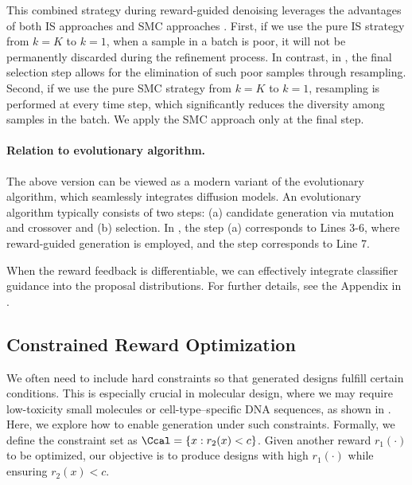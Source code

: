 This combined strategy during reward-guided denoising leverages the advantages of both IS approaches \citep{li2024derivative} and SMC approaches \citep{wu2024practical}. First, if we use the pure IS strategy from  $k=K$ to $k=1$, when a sample in a batch is poor, it will not be permanently discarded during the refinement process. In contrast, in , the final selection step allows for the elimination of such poor samples through resampling. Second, if we use the pure SMC strategy from $k=K$ to $k=1$, resampling is performed at every time step, which significantly reduces the diversity among samples in the batch. We apply the SMC approach only at the final step.


\vspace{-2mm}
\paragraph{Relation to evolutionary algorithm.} The above version can be viewed as a modern variant of the evolutionary algorithm, which seamlessly integrates diffusion models. An evolutionary algorithm typically consists of two steps: (a) candidate generation via mutation and crossover and (b) selection. In , the step (a) corresponds to Lines 3-6, where reward-guided generation is employed, and the step corresponds to Line 7. 


\begin{remark}
When the reward feedback is differentiable, we can effectively integrate classifier guidance into the proposal distributions. For further details, see the Appendix in \citet{li2024derivative}.
\end{remark}


\subsection{Constrained Reward Optimization}\label{sec:hard_constraint}

We often need to include hard constraints so that generated designs fulfill certain conditions. This is especially crucial in molecular design, where we may require low-toxicity small molecules or cell-type–specific DNA sequences, as shown in . Here, we explore how to enable generation under such constraints. Formally, we define the constraint set as $\Ccal = \{x:r_2(x)<c\}$. Given another reward $r_1(\cdot)$ to be optimized, our objective is to produce designs with high $r_1(\cdot)$ while ensuring $r_2(x)<c$. 

